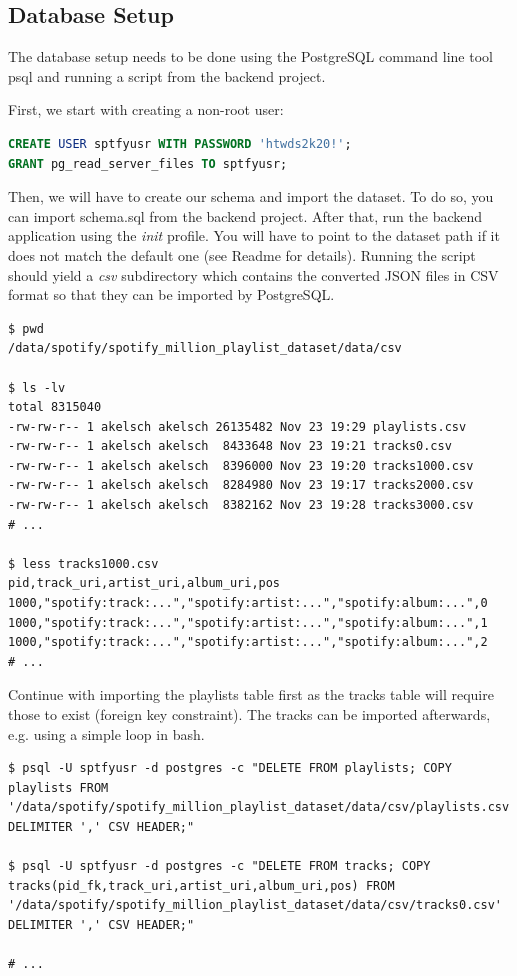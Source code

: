 \subsection{Database Setup}

The database setup needs to be done using the PostgreSQL command line tool psql and running a script from the backend project.

First, we start with creating a non-root user:

\begin{lstlisting}[caption={Creating a user in PostgreSQL}, style=Base, language=SQL]
CREATE USER sptfyusr WITH PASSWORD 'htwds2k20!';
GRANT pg_read_server_files TO sptfyusr;
\end{lstlisting}

Then, we will have to create our schema and import the dataset. To do so, you can import schema.sql from the backend project. After that, run the backend application using the \textit{init} profile. You will have to point to the dataset path if it does not match the default one (see Readme for details). Running the script should yield a \textit{csv} subdirectory which contains the converted JSON files in CSV format so that they can be imported by PostgreSQL.

\begin{lstlisting}[caption={Expected CSV output after running the init script}, style=Terminal]
$ pwd
/data/spotify/spotify_million_playlist_dataset/data/csv

$ ls -lv
total 8315040
-rw-rw-r-- 1 akelsch akelsch 26135482 Nov 23 19:29 playlists.csv
-rw-rw-r-- 1 akelsch akelsch  8433648 Nov 23 19:21 tracks0.csv
-rw-rw-r-- 1 akelsch akelsch  8396000 Nov 23 19:20 tracks1000.csv
-rw-rw-r-- 1 akelsch akelsch  8284980 Nov 23 19:17 tracks2000.csv
-rw-rw-r-- 1 akelsch akelsch  8382162 Nov 23 19:28 tracks3000.csv
# ...

$ less tracks1000.csv
pid,track_uri,artist_uri,album_uri,pos
1000,"spotify:track:...","spotify:artist:...","spotify:album:...",0
1000,"spotify:track:...","spotify:artist:...","spotify:album:...",1
1000,"spotify:track:...","spotify:artist:...","spotify:album:...",2
# ...
\end{lstlisting}

Continue with importing the playlists table first as the tracks table will require those to exist (foreign key constraint). The tracks can be imported afterwards, e.g. using a simple loop in bash.

\begin{lstlisting}[caption={Importing CSV files into PostgreSQL}, style=Terminal]
$ psql -U sptfyusr -d postgres -c "DELETE FROM playlists; COPY playlists FROM '/data/spotify/spotify_million_playlist_dataset/data/csv/playlists.csv' DELIMITER ',' CSV HEADER;"

$ psql -U sptfyusr -d postgres -c "DELETE FROM tracks; COPY tracks(pid_fk,track_uri,artist_uri,album_uri,pos) FROM '/data/spotify/spotify_million_playlist_dataset/data/csv/tracks0.csv' DELIMITER ',' CSV HEADER;"

# ...
\end{lstlisting}

